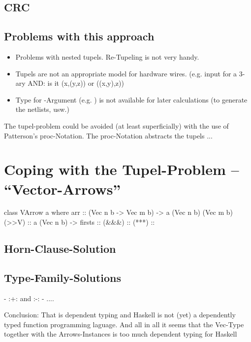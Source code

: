 \documentclass{article}
\begin{document}
\subsection{CRC}

\subsection{Problems with this approach}

\begin{itemize}
\item Problems with nested tupels. Re-Tupeling is not very handy.
\item Tupels are not an appropriate model for hardware wires. (e.g. input for a 3-ary AND: is it (x,(y,z)) or ((x,y),z)) 
\item Type for -Argument (e.g. ) is not available for later calculations (to generate the netlists, usw.)
\end{itemize}

The tupel-problem could be avoided (at least superficially) with the use of Patterson's proc-Notation. The proc-Notation
abstracts the tupels ...


\section{Coping with the Tupel-Problem -- "`Vector-Arrows"'}

\begin{haskell}
class VArrow a where
  arr    :: (Vec n b -> Vec m b) -> a (Vec n b) (Vec m b)
  (>>V)  :: a (Vec n b) -> 
  firsts :: 
  (&&&)  :: 
  (***)  :: 
\end{haskell}

\subsection{Horn-Clause-Solution}

\subsection{Type-Family-Solutions}

-  :+: and :-:
- ....

Conclusion: That is dependent typing and Haskell is not (yet) a dependently typed function programming laguage. And all
in all it seems that the Vec-Type together with the Arrows-Instances is too much dependent typing for Haskell
\end{document}
